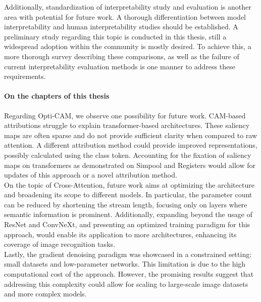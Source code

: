 \noindent Additionally, standardization of interpretability study and evaluation is another area 
with potential for future work. A thorough differentiation between model 
interpretability and human interpretability studies should be established. A preliminary study 
regarding this topic is conducted in this thesis, still a widespread adoption within the 
community is mostly desired. To achieve this, a more thorough survey describing these comparisons, 
as well as the failure of current interpretability evaluation methods is one manner to address 
these requirements.\\

\paragraph{On the chapters of this thesis}
\noindent Regarding Opti-CAM, we observe one possibility for future work. CAM-based 
attributions struggle to explain transformer-based architectures. These saliency maps are often 
sparse and do not provide sufficient clarity when compared to raw attention. A different 
attribution method could provide improved representations, possibly calculated using the class 
token. Accounting for the fixation of saliency maps on transformers as demonstrated on 
Simpool \autocite{psomas2023simpool} and Registers \autocite{darcet2024vision} would 
allow for updates of this approach or a novel attribution method.\\

\noindent On the topic of Cross-Attention, future work aims at optimizing the architecture and 
broadening its scope to different models. In particular, the parameter count can be reduced by 
shortening the stream length, focusing only on layers where semantic information is prominent. 
Additionally, expanding beyond the usage of ResNet and ConvNeXt, and presenting an optimized 
training paradigm for this approach, would enable its application to more architectures, enhancing 
its coverage of image recognition tasks.\\

\noindent Lastly, the gradient denoising paradigm was showcased in a constrained setting: small 
datasets and low-parameter networks. This limitation is due to the high computational cost of the 
approach. However, the promising results suggest that addressing this complexity could allow for 
scaling to large-scale image datasets and more complex models.\\

